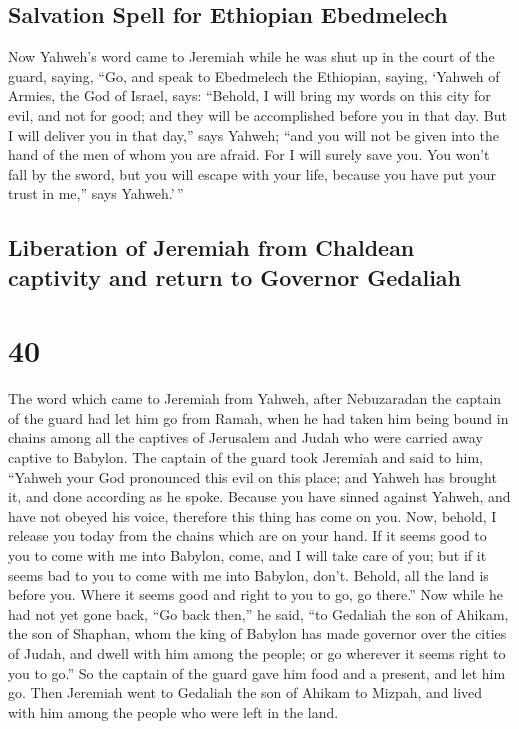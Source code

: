 \hypertarget{salvation-spell-for-ethiopian-ebedmelech}{%
\subsection{Salvation Spell for Ethiopian
Ebedmelech}\label{salvation-spell-for-ethiopian-ebedmelech}}

 Now Yahweh's word came to Jeremiah while he was shut up
in the court of the guard, saying,  ``Go, and speak to
Ebedmelech the Ethiopian, saying, `Yahweh of Armies, the God of Israel,
says: ``Behold, I will bring my words on this city for evil, and not for
good; and they will be accomplished before you in that day.
 But I will deliver you in that day,'' says Yahweh; ``and
you will not be given into the hand of the men of whom you are afraid.
 For I will surely save you. You won't fall by the sword,
but you will escape with your life, because you have put your trust in
me,'' says Yahweh.'\,''

\hypertarget{liberation-of-jeremiah-from-chaldean-captivity-and-return-to-governor-gedaliah}{%
\subsection{Liberation of Jeremiah from Chaldean captivity and return to
Governor
Gedaliah}\label{liberation-of-jeremiah-from-chaldean-captivity-and-return-to-governor-gedaliah}}

\hypertarget{section-39}{%
\section{40}\label{section-39}}

 The word which came to Jeremiah from Yahweh, after
Nebuzaradan the captain of the guard had let him go from Ramah, when he
had taken him being bound in chains among all the captives of Jerusalem
and Judah who were carried away captive to Babylon.  The
captain of the guard took Jeremiah and said to him, ``Yahweh your God
pronounced this evil on this place;  and Yahweh has
brought it, and done according as he spoke. Because you have sinned
against Yahweh, and have not obeyed his voice, therefore this thing has
come on you.  Now, behold, I release you today from the
chains which are on your hand. If it seems good to you to come with me
into Babylon, come, and I will take care of you; but if it seems bad to
you to come with me into Babylon, don't. Behold, all the land is before
you. Where it seems good and right to you to go, go there.''
 Now while he had not yet gone back, ``Go back then,'' he
said, ``to Gedaliah the son of Ahikam, the son of Shaphan, whom the king
of Babylon has made governor over the cities of Judah, and dwell with
him among the people; or go wherever it seems right to you to go.'' So
the captain of the guard gave him food and a present, and let him go.
 Then Jeremiah went to Gedaliah the son of Ahikam to
Mizpah, and lived with him among the people who were left in the land.

